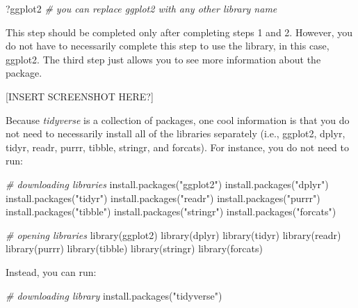 \documentclass[
]{book}
\newenvironment{Shaded}{\begin{snugshade}}{\end{snugshade}}
\newcommand{\CommentTok}[1]{\textcolor[rgb]{0.56,0.35,0.01}{\textit{#1}}}
\newcommand{\FunctionTok}[1]{\textcolor[rgb]{0.00,0.00,0.00}{#1}}
\newcommand{\NormalTok}[1]{#1}
\newcommand{\StringTok}[1]{\textcolor[rgb]{0.31,0.60,0.02}{#1}}
\begin{document}
\begin{Shaded}
\begin{Highlighting}[]
\NormalTok{?ggplot2 }\CommentTok{\# you can replace ggplot2 with any other library name}
\end{Highlighting}
\end{Shaded}

This step should be completed only after completing steps 1 and 2. However, you do not have to necessarily complete this step to use the library, in this case, ggplot2. The third step just allows you to see more information about the package.

{[}INSERT SCREENSHOT HERE?{]}

Because \emph{tidyverse} is a collection of packages, one cool information is that you do not need to necessarily install all of the libraries separately (i.e., ggplot2, dplyr, tidyr, readr, purrr, tibble, stringr, and forcats). For instance, you do not need to run:

\begin{Shaded}
\begin{Highlighting}[]
\CommentTok{\# downloading libraries}
\FunctionTok{install.packages}\NormalTok{(}\StringTok{"ggplot2"}\NormalTok{)}
\FunctionTok{install.packages}\NormalTok{(}\StringTok{"dplyr"}\NormalTok{)}
\FunctionTok{install.packages}\NormalTok{(}\StringTok{"tidyr"}\NormalTok{)}
\FunctionTok{install.packages}\NormalTok{(}\StringTok{"readr"}\NormalTok{)}
\FunctionTok{install.packages}\NormalTok{(}\StringTok{"purrr"}\NormalTok{)}
\FunctionTok{install.packages}\NormalTok{(}\StringTok{"tibble"}\NormalTok{)}
\FunctionTok{install.packages}\NormalTok{(}\StringTok{"stringr"}\NormalTok{)}
\FunctionTok{install.packages}\NormalTok{(}\StringTok{"forcats"}\NormalTok{)}

\CommentTok{\# opening libraries}
\FunctionTok{library}\NormalTok{(ggplot2)}
\FunctionTok{library}\NormalTok{(dplyr)}
\FunctionTok{library}\NormalTok{(tidyr)}
\FunctionTok{library}\NormalTok{(readr)}
\FunctionTok{library}\NormalTok{(purrr)}
\FunctionTok{library}\NormalTok{(tibble)}
\FunctionTok{library}\NormalTok{(stringr)}
\FunctionTok{library}\NormalTok{(forcats)}
\end{Highlighting}
\end{Shaded}

Instead, you can run:

\begin{Shaded}
\begin{Highlighting}[]
\CommentTok{\# downloading library}
\FunctionTok{install.packages}\NormalTok{(}\StringTok{"tidyverse"}\NormalTok{)}
\end{Highlighting}
\end{Shaded}
\end{document}
